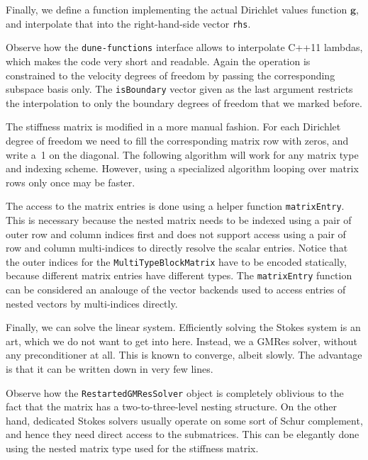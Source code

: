 \documentclass[a4paper,10pt,headings=normal,bibliography=totoc]{scrartcl}
\newcommand{\cpp}[1]{\lstinline[basicstyle=\ttfamily]!#1!}
\newcommand{\dunemodule}[1]{\texttt{#1}}
\begin{document}
Finally, we define a function implementing the actual Dirichlet values function $\mathbf{g}$, and interpolate
that into the right-hand-side vector \cpp{rhs}.
%

%
Observe how the \dunemodule{dune-functions} interface allows to interpolate C++11 lambdas, which makes the code
very short and readable. Again the operation is constrained to the velocity degrees of freedom
by passing the corresponding subspace basis only.
The \cpp{isBoundary} vector given as the last argument restricts the interpolation
to only the boundary degrees of freedom that we marked before.

The stiffness matrix is modified in a more manual fashion.  For each Dirichlet degree of freedom we need to fill the corresponding matrix row
with zeros, and write a~1 on the diagonal.
The following algorithm will work for any matrix type and indexing scheme.
However, using a specialized algorithm looping over matrix rows only once
may be faster.
%

%
The access to the matrix entries is done using a helper function \cpp{matrixEntry}.
This is necessary because the nested matrix needs to be indexed using a pair
of outer row and column indices first and does not support access
using a pair of row and column multi-indices to directly resolve the scalar entries.
Notice that the outer indices for the \cpp{MultiTypeBlockMatrix} have to be
encoded statically, because different matrix entries have different types.
The \cpp{matrixEntry} function can be considered an analouge of the vector backends
used to access entries of nested vectors by multi-indices directly.
%

%

Finally, we can solve the linear system.  Efficiently solving the Stokes system is an art, which we do not want to
get into here.  Instead, we a GMRes solver, without any preconditioner at all.  This is known to converge,
albeit slowly.
The advantage is that it can be written down in very few lines.
%

%
Observe how the \cpp{RestartedGMResSolver} object is completely oblivious to the fact that the matrix
has a two-to-three-level nesting structure.  On the other hand, dedicated Stokes solvers usually operate
on some sort of Schur complement, and hence they need direct access
to the submatrices.  This can be elegantly done using the nested matrix type
used for the stiffness matrix.
\end{document}
